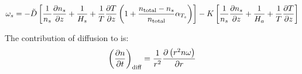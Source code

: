 \begin{equation}
\omega_s = -\tilde{D} \left[\frac{1}{n_s}\frac{\partial n_s}{\partial z} + \frac{1}{H_s} + 
                                \frac{1}{T}\frac{\partial T}{\partial z}\left(1 + \frac{n_\text{total} - n_s}{n_\text{total}}\alpha_{T_s}\right)\right] - 
                  K \left[\frac{1}{n_s}\frac{\partial n_s}{\partial z} + \frac{1}{H_a} + \frac{1}{T}\frac{\partial T}{\partial z}\right]
\label{Titan:omega_diff}
\end{equation}

The contribution of diffusion to  is:
\begin{equation}
\left(\frac{\partial n}{\partial t}\right)_{\text{diff}} = \frac{1}{r^2}\frac{\partial\left(r^2n\omega\right)}{\partial r}
\label{Titan:diffusion}
\end{equation}
